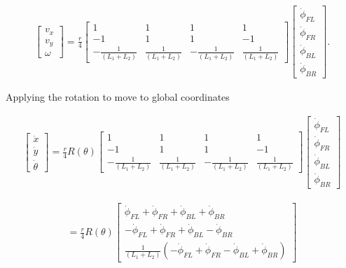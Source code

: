 \[\begin{aligned}
\begin{bmatrix}v_x \\[3mm] v_y \\[3mm] \omega \end{bmatrix}
=  \frac{r}{4} \begin{bmatrix} 1 & 1 & 1 & 1 \\[3mm]
                        -1 & 1 & 1 & -1\\[3mm]
                         -\frac{1}{(L_1+L_2)} & \frac{1}{(L_1+L_2)} & -\frac{1}{(L_1+L_2)} &
                            \frac{1}{(L_1+L_2)}
         \end{bmatrix}
\begin{bmatrix}\dot{\phi}_{FL} \\ \dot{\phi}_{FR} \\ \dot{\phi}_{BL} \\ \dot{\phi}_{BR} \end{bmatrix} .
\end{aligned}\]

Applying the rotation to move to global coordinates

\[\begin{aligned}
\begin{bmatrix}\dot{x}\\[3mm] \dot{y}\\[3mm] \dot{\theta} \end{bmatrix}
=  \frac{r}{4} R(\theta)\begin{bmatrix} 1 & 1 & 1 & 1 \\[3mm]
                        -1 & 1 & 1 & -1\\[3mm]
                         -\frac{1}{(L_1+L_2)} & \frac{1}{(L_1+L_2)} & -\frac{1}{(L_1+L_2)} &
                            \frac{1}{(L_1+L_2)}
         \end{bmatrix}
\begin{bmatrix}\dot{\phi}_{FL} \\ \dot{\phi}_{FR} \\ \dot{\phi}_{BL} \\ \dot{\phi}_{BR} \end{bmatrix}
\end{aligned}\]

\[\begin{aligned}
=
\frac{ r}{4} R(\theta)\begin{bmatrix} \dot{\phi}_{FL} + \dot{\phi}_{FR} + \dot{\phi}_{BL} + \dot{\phi}_{BR} \\[3mm]
                        -\dot{\phi}_{FL} + \dot{\phi}_{FR} + \dot{\phi}_{BL} - \dot{\phi}_{BR}  \\[3mm]
                            \frac{1}{(L_1+L_2) } \left( -\dot{\phi}_{FL} + \dot{\phi}_{FR} - \dot{\phi}_{BL} +\dot{\phi}_{BR} \right)
         \end{bmatrix}
\end{aligned}\]

